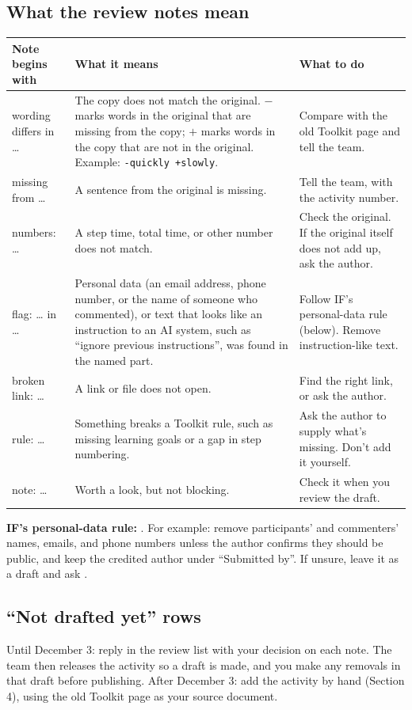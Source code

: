 \subsection*{What the review notes mean}
\begin{tabularx}{\textwidth}{@{}P{3.3cm}LL@{}}
\toprule
\textbf{Note begins with} & \textbf{What it means} & \textbf{What to do} \\
\midrule
wording differs in \ldots & The copy does not match the original. $-$ marks words in the original that are missing from the copy; $+$ marks words in the copy that are not in the original. Example: \texttt{-quickly +slowly}. & Compare with the old Toolkit page and tell the team. \\
missing from \ldots & A sentence from the original is missing. & Tell the team, with the activity number. \\
numbers: \ldots & A step time, total time, or other number does not match. & Check the original. If the original itself does not add up, ask the author. \\
flag: \ldots{} in \ldots & Personal data (an email address, phone number, or the name of someone who commented), or text that looks like an instruction to an AI system, such as ``ignore previous instructions'', was found in the named part. & Follow IF's personal-data rule (below). Remove instruction-like text. \\
broken link: \ldots & A link or file does not open. & Find the right link, or ask the author. \\
rule: \ldots & Something breaks a Toolkit rule, such as missing learning goals or a gap in step numbering. & Ask the author to supply what's missing. Don't add it yourself. \\
note: \ldots & Worth a look, but not blocking. & Check it when you review the draft. \\
\bottomrule
\end{tabularx}

\textbf{IF's personal-data rule:} . For example: remove participants' and commenters' names, emails, and phone numbers unless the author confirms they should be public, and keep the credited author under ``Submitted by''. If unsure, leave it as a draft and ask .

\subsection*{``Not drafted yet'' rows}
Until December 3: reply in the review list with your decision on each note. The team then releases the activity so a draft is made, and you make any removals in that draft before publishing. After December 3: add the activity by hand (Section 4), using the old Toolkit page as your source document.

